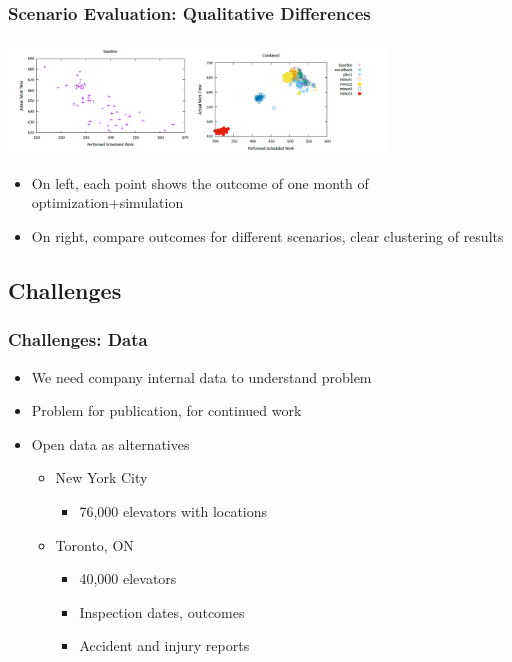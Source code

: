 \begin{frame}
\frametitle{Scenario Evaluation: Qualitative Differences}
\includegraphics[width=10cm]{imagesfieldservice/scheduledactualwork}
\begin{itemize}
\item On left, each point shows the outcome of one month of optimization+simulation
\item On right, compare outcomes for different scenarios, clear clustering of results
\end{itemize}
\end{frame}



\subsection{Challenges}

\begin{frame}
\frametitle{Challenges: Data}
\begin{itemize}
\item We need company internal data to understand problem
\item Problem for publication, for continued work
\item Open data as alternatives
\begin{itemize}
\item New York City
\begin{itemize}
\item 76,000 elevators with locations
\end{itemize}
\item Toronto, ON
\begin{itemize}
\item 40,000 elevators
\item Inspection dates, outcomes
\item Accident and injury reports
\end{itemize}
\end{itemize}
\end{itemize}
\end{frame}

